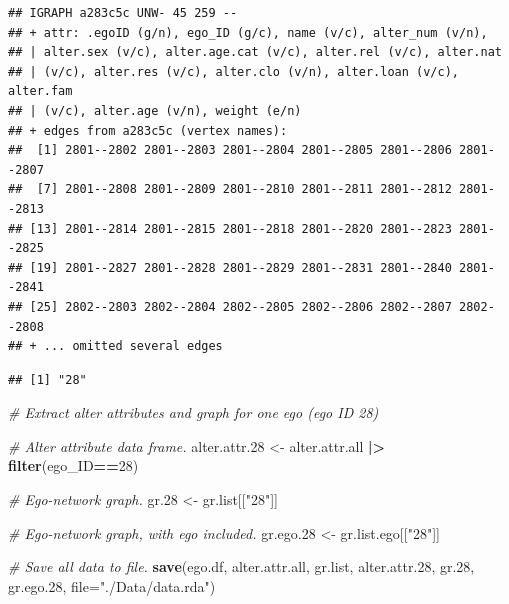 \documentclass[
]{book}
\newenvironment{Shaded}{\begin{snugshade}}{\end{snugshade}}
\newcommand{\AttributeTok}[1]{\textcolor[rgb]{0.13,0.29,0.53}{#1}}
\newcommand{\CommentTok}[1]{\textcolor[rgb]{0.56,0.35,0.01}{\textit{#1}}}
\newcommand{\DecValTok}[1]{\textcolor[rgb]{0.00,0.00,0.81}{#1}}
\newcommand{\FloatTok}[1]{\textcolor[rgb]{0.00,0.00,0.81}{#1}}
\newcommand{\FunctionTok}[1]{\textcolor[rgb]{0.13,0.29,0.53}{\textbf{#1}}}
\newcommand{\NormalTok}[1]{#1}
\newcommand{\OtherTok}[1]{\textcolor[rgb]{0.56,0.35,0.01}{#1}}
\newcommand{\SpecialCharTok}[1]{\textcolor[rgb]{0.81,0.36,0.00}{\textbf{#1}}}
\newcommand{\StringTok}[1]{\textcolor[rgb]{0.31,0.60,0.02}{#1}}
\begin{document}
\begin{verbatim}
## IGRAPH a283c5c UNW- 45 259 -- 
## + attr: .egoID (g/n), ego_ID (g/c), name (v/c), alter_num (v/n),
## | alter.sex (v/c), alter.age.cat (v/c), alter.rel (v/c), alter.nat
## | (v/c), alter.res (v/c), alter.clo (v/n), alter.loan (v/c), alter.fam
## | (v/c), alter.age (v/n), weight (e/n)
## + edges from a283c5c (vertex names):
##  [1] 2801--2802 2801--2803 2801--2804 2801--2805 2801--2806 2801--2807
##  [7] 2801--2808 2801--2809 2801--2810 2801--2811 2801--2812 2801--2813
## [13] 2801--2814 2801--2815 2801--2818 2801--2820 2801--2823 2801--2825
## [19] 2801--2827 2801--2828 2801--2829 2801--2831 2801--2840 2801--2841
## [25] 2802--2803 2802--2804 2802--2805 2802--2806 2802--2807 2802--2808
## + ... omitted several edges
\end{verbatim}

\begin{Shaded}
\end{Shaded}

\begin{verbatim}
## [1] "28"
\end{verbatim}

\begin{Shaded}
\begin{Highlighting}[]
\CommentTok{\# Extract alter attributes and graph for one ego (ego ID 28)}

\CommentTok{\# Alter attribute data frame.}
\NormalTok{alter.attr}\FloatTok{.28} \OtherTok{\textless{}{-}}\NormalTok{ alter.attr.all }\SpecialCharTok{|\textgreater{}}
  \FunctionTok{filter}\NormalTok{(ego\_ID}\SpecialCharTok{==}\DecValTok{28}\NormalTok{)}

\CommentTok{\# Ego{-}network graph.}
\NormalTok{gr}\FloatTok{.28} \OtherTok{\textless{}{-}}\NormalTok{ gr.list[[}\StringTok{"28"}\NormalTok{]]}

\CommentTok{\# Ego{-}network graph, with ego included.}
\NormalTok{gr.ego}\FloatTok{.28} \OtherTok{\textless{}{-}}\NormalTok{ gr.list.ego[[}\StringTok{"28"}\NormalTok{]]}

\CommentTok{\# Save all data to file.}
\FunctionTok{save}\NormalTok{(ego.df, alter.attr.all, gr.list, alter.attr}\FloatTok{.28}\NormalTok{, gr}\FloatTok{.28}\NormalTok{, gr.ego}\FloatTok{.28}\NormalTok{, }\AttributeTok{file=}\StringTok{"./Data/data.rda"}\NormalTok{)}
\end{Highlighting}
\end{Shaded}
\end{document}
